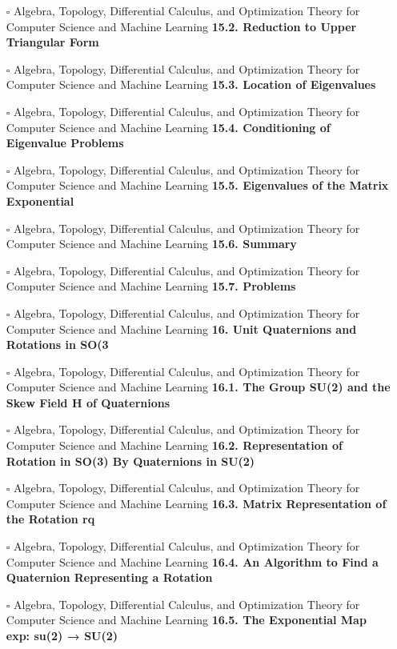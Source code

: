 \documentclass[a4, landscape, 12pt]{article}
\newcommand{\checkbox}{$\square$}%
\begin{document}
\begin{itemize}
{}
\item [\checkbox]  Algebra, Topology, Differential Calculus, and Optimization Theory for Computer Science and Machine Learning \textbf{ 15.2. Reduction to Upper Triangular Form
}
\item [\checkbox]  Algebra, Topology, Differential Calculus, and Optimization Theory for Computer Science and Machine Learning \textbf{ 15.3. Location of Eigenvalues
}
\item [\checkbox]  Algebra, Topology, Differential Calculus, and Optimization Theory for Computer Science and Machine Learning \textbf{ 15.4. Conditioning of Eigenvalue Problems
}
\item [\checkbox]  Algebra, Topology, Differential Calculus, and Optimization Theory for Computer Science and Machine Learning \textbf{ 15.5. Eigenvalues of the Matrix Exponential
}
\item [\checkbox]  Algebra, Topology, Differential Calculus, and Optimization Theory for Computer Science and Machine Learning \textbf{ 15.6. Summary
}
\item [\checkbox]  Algebra, Topology, Differential Calculus, and Optimization Theory for Computer Science and Machine Learning \textbf{ 15.7. Problems
}
\item [\checkbox]  Algebra, Topology, Differential Calculus, and Optimization Theory for Computer Science and Machine Learning \textbf{ 16. Unit Quaternions and Rotations in SO(3
}
\item [\checkbox]  Algebra, Topology, Differential Calculus, and Optimization Theory for Computer Science and Machine Learning \textbf{ 16.1. The Group SU(2) and the Skew Field H of Quaternions
}
\item [\checkbox]  Algebra, Topology, Differential Calculus, and Optimization Theory for Computer Science and Machine Learning \textbf{ 16.2. Representation of Rotation in SO(3) By Quaternions in SU(2)
}
\item [\checkbox]  Algebra, Topology, Differential Calculus, and Optimization Theory for Computer Science and Machine Learning \textbf{ 16.3. Matrix Representation of the Rotation rq
}
\item [\checkbox]  Algebra, Topology, Differential Calculus, and Optimization Theory for Computer Science and Machine Learning \textbf{ 16.4. An Algorithm to Find a Quaternion Representing a Rotation
}
\item [\checkbox]  Algebra, Topology, Differential Calculus, and Optimization Theory for Computer Science and Machine Learning \textbf{ 16.5. The Exponential Map exp: su(2) → SU(2)
}
\end{itemize}
\end{document}
